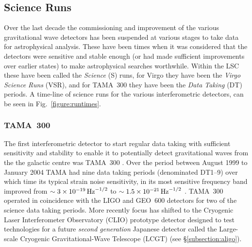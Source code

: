 \documentclass{article}
\begin{document}
\subsection{Science Runs}\label{subsection:runs}
Over the last decade the commissioning and improvement of the various gravitational 
wave detectors has been suspended at various stages to take data for
astrophysical analysis. These have been times when it was considered that the 
detectors were sensitive and stable enough (or had made sufficient improvements
over earlier states) to make astrophysical searches worthwhile. Within the LSC 
these have been called the {\it Science} (S) runs, for Virgo they have been the 
{\it Virgo Science Runs} (VSR), and for TAMA~300 they have been the {\it Data 
Taking} (DT) periods. A time-line of science runs for the various interferometric 
detectors, can be seen in Fig.~\ref{figure:runtimes}.


\subsubsection{TAMA~300}
The first interferometric detector to start regular data taking with sufficient
sensitivity and stability to enable it to potentially detect gravitational waves from the the galactic
centre was TAMA~300 \cite{Ando:2001}. Over the period between August 1999 to
January 2004 TAMA had nine data taking periods (denominated DT1--9) over which
time its typical strain noise sensitivity, in its most sensitive frequency band
improved from $\sim3\times10^{-19}\,{\rm Hz}^{-1/2}$ to
$\sim1.5\times10^{-21}\,{\rm Hz}^{-1/2}$ \cite{Akutsu:2006}.  TAMA~300 operated 
in coincidence with the LIGO and GEO~600 detectors for two of the science data 
taking periods. More recently focus has shifted to the Cryogenic Laser 
Interferometer Observatory (CLIO) prototype detector \cite{Yamamoto:2008, 
CLIOweb} designed to test technologies for a future {\it second generation} Japanese detector
called the Large-scale Cryogenic Gravitational-Wave Telescope (LCGT) 
(see \S\ref{subsection:aligo}).
\end{document}
